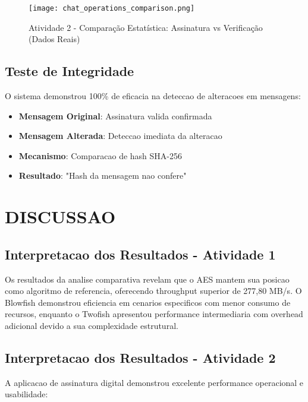 \documentclass[12pt,a4paper,oneside]{article}
\begin{document}
\begin{figure}[H]
\centering
\texttt{[image: chat\_operations\_comparison.png]}
\caption{Atividade 2 - Comparação Estatística: Assinatura vs Verificação (Dados Reais)}
\label{fig:atividade2_comparison_final}
\end{figure}

\subsection{Teste de Integridade}

O sistema demonstrou 100\% de eficacia na deteccao de alteracoes em mensagens:

\begin{itemize}
    \item \textbf{Mensagem Original}: Assinatura valida confirmada
    \item \textbf{Mensagem Alterada}: Deteccao imediata da alteracao
    \item \textbf{Mecanismo}: Comparacao de hash SHA-256
    \item \textbf{Resultado}: "Hash da mensagem nao confere"
\end{itemize}

\section{DISCUSSAO}

\subsection{Interpretacao dos Resultados - Atividade 1}

Os resultados da analise comparativa revelam que o AES mantem sua posicao como algoritmo de referencia, oferecendo throughput superior de 277,80 MB/s. O Blowfish demonstrou eficiencia em cenarios especificos com menor consumo de recursos, enquanto o Twofish apresentou performance intermediaria com overhead adicional devido a sua complexidade estrutural.

\subsection{Interpretacao dos Resultados - Atividade 2}

A aplicacao de assinatura digital demonstrou excelente performance operacional e usabilidade:
\end{document}
